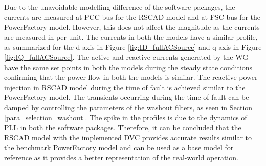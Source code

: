 Due to the unavoidable modelling difference of the software packages, the currents are measured at \gls{PCC} bus for the RSCAD model and at \gls{FSC} bus for the PowerFactory model. However, this does not affect the magnitude as the currents are measured in per unit. The currents in both the models have a similar profile, as summarized for the d-axis in Figure \ref{fig:ID_fullACSource} and q-axis in Figure \ref{fig:IQ_fullACSource}. The active and reactive currents generated by the \gls{WG} have the same set points in both the models during the steady state conditions confirming that the power flow in both the models is similar. The reactive power injection in RSCAD model during the time of fault is achieved similar to the PowerFactory model. The transients occurring during the time of fault can be damped by controlling the parameters of the washout filters, as seen in Section \ref{para_selection_washout}. The spike in the profiles is due to the dynamics of \gls{PLL} in both the software packages. Therefore, it can be concluded that the RSCAD model with the implemented \gls{DVC} provides accurate results similar to the benchmark PowerFactory model and can be used as a base model for reference as it provides a better representation of the real-world operation.  

